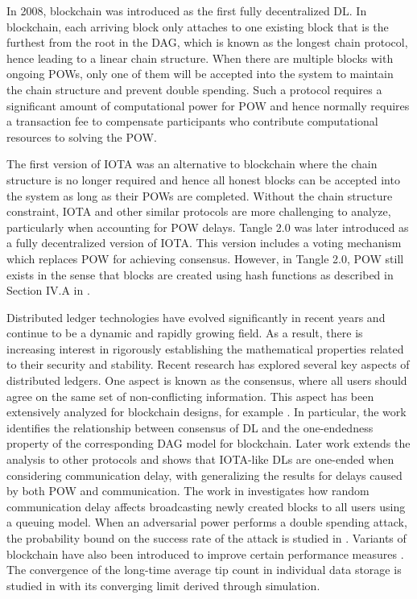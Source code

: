\documentclass[12pt]{article}
\numberwithin{equation}{section}  %
\begin{document}
In 2008, blockchain \cite{Naka08,Zh17} was introduced as the first fully decentralized DL. In blockchain, each arriving block only attaches to one existing block that is the furthest from the root in the DAG, which is known as the longest chain protocol, hence leading to a linear chain structure. When there are multiple blocks with ongoing POWs, only one of them will be accepted into the system to maintain the chain structure and prevent double spending. Such a protocol requires a significant amount of computational power for POW and hence normally requires a transaction fee to compensate participants who contribute computational resources to solving the POW. 

The first version of IOTA \cite{Popov16} was an alternative to blockchain where the chain structure is no longer required and hence all honest blocks can be accepted into the system as long as their POWs are completed. Without the chain structure constraint, IOTA and other similar protocols are more challenging to analyze, particularly when accounting for POW delays. Tangle 2.0 \cite{muller2022tangle} was later introduced as a fully decentralized version of IOTA. This version includes a voting mechanism which replaces POW for achieving consensus. However, in Tangle 2.0, POW still exists in the sense that blocks are created using hash functions as described in Section IV.A in \cite{muller2022tangle}.

Distributed ledger technologies have evolved significantly in recent years and continue to be a dynamic and rapidly growing field. As a result, there is increasing interest in rigorously establishing the mathematical properties related to their security and stability. Recent research has explored several key aspects of distributed ledgers. One aspect is known as the consensus, where all users should agree on
the same set of non-conflicting information. This aspect has been extensively analyzed for blockchain designs, for example \cite{Pa19,Zh20,Am22}. In particular, the work \cite{PS20} identifies the relationship between consensus of DL and the one-endedness property of the corresponding DAG model for blockchain. Later work \cite{GO20} extends the analysis to other protocols and shows that IOTA-like DLs are one-ended when considering communication delay, with \cite{feng2023almost} generalizing the results for delays caused by both POW and communication. The work in \cite{frolkova2019bitcoin} investigates how random communication delay affects broadcasting newly created blocks to all users using a queuing model. When an adversarial power performs a double spending attack, the probability bound on the success rate of the attack is studied in \cite{Go19,Ga22}. Variants of blockchain have also been introduced to improve certain performance measures \cite{LY15,SS21}. The convergence of the long-time average tip count in individual data storage is studied in \cite{MU23} with its converging limit derived through simulation.
\end{document}
